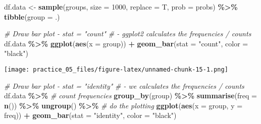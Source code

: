 \documentclass[
]{article}
\newenvironment{Shaded}{\begin{snugshade}}{\end{snugshade}}
\newcommand{\AttributeTok}[1]{\textcolor[rgb]{0.13,0.29,0.53}{#1}}
\newcommand{\CommentTok}[1]{\textcolor[rgb]{0.56,0.35,0.01}{\textit{#1}}}
\newcommand{\DecValTok}[1]{\textcolor[rgb]{0.00,0.00,0.81}{#1}}
\newcommand{\FunctionTok}[1]{\textcolor[rgb]{0.13,0.29,0.53}{\textbf{#1}}}
\newcommand{\NormalTok}[1]{#1}
\newcommand{\OtherTok}[1]{\textcolor[rgb]{0.56,0.35,0.01}{#1}}
\newcommand{\SpecialCharTok}[1]{\textcolor[rgb]{0.81,0.36,0.00}{\textbf{#1}}}
\newcommand{\StringTok}[1]{\textcolor[rgb]{0.31,0.60,0.02}{#1}}
\begin{document}
\begin{Shaded}
\begin{Highlighting}[]
\NormalTok{df.data }\OtherTok{\textless{}{-}} \FunctionTok{sample}\NormalTok{(groups, }
                  \AttributeTok{size =} \DecValTok{1000}\NormalTok{, }
                  \AttributeTok{replace =}\NormalTok{ T, }
                  \AttributeTok{prob =}\NormalTok{ probs) }\SpecialCharTok{\%\textgreater{}\%} 
  \FunctionTok{tibble}\NormalTok{(}\AttributeTok{group =}\NormalTok{ .)}
\end{Highlighting}
\end{Shaded}

\begin{Shaded}
\begin{Highlighting}[]
\CommentTok{\# Draw bar plot {-} stat = "count"}
\CommentTok{\# {-} ggplot2 calculates the frequencies / counts}
\NormalTok{df.data }\SpecialCharTok{\%\textgreater{}\%} 
  \FunctionTok{ggplot}\NormalTok{(}\FunctionTok{aes}\NormalTok{(}\AttributeTok{x =}\NormalTok{ group)) }\SpecialCharTok{+}
  \FunctionTok{geom\_bar}\NormalTok{(}\AttributeTok{stat =} \StringTok{"count"}\NormalTok{,}
           \AttributeTok{color =} \StringTok{"black"}\NormalTok{)}
\end{Highlighting}
\end{Shaded}

\texttt{[image: practice\_05\_files/figure-latex/unnamed-chunk-15-1.png]}

\begin{Shaded}
\begin{Highlighting}[]
\CommentTok{\# Draw bar plot {-} stat = "identity"}
\CommentTok{\# {-} we calculates the frequencies / counts}
\NormalTok{df.data }\SpecialCharTok{\%\textgreater{}\%}
  \CommentTok{\# count frequencies}
  \FunctionTok{group\_by}\NormalTok{(group) }\SpecialCharTok{\%\textgreater{}\%} 
  \FunctionTok{summarise}\NormalTok{(}\AttributeTok{freq =} \FunctionTok{n}\NormalTok{()) }\SpecialCharTok{\%\textgreater{}\%} 
  \FunctionTok{ungroup}\NormalTok{() }\SpecialCharTok{\%\textgreater{}\%} 
  \CommentTok{\# do the plotting}
  \FunctionTok{ggplot}\NormalTok{(}\FunctionTok{aes}\NormalTok{(}\AttributeTok{x =}\NormalTok{ group,}
             \AttributeTok{y =}\NormalTok{ freq)) }\SpecialCharTok{+}
  \FunctionTok{geom\_bar}\NormalTok{(}\AttributeTok{stat =} \StringTok{"identity"}\NormalTok{,}
           \AttributeTok{color =} \StringTok{"black"}\NormalTok{)}
\end{Highlighting}
\end{Shaded}
\end{document}
